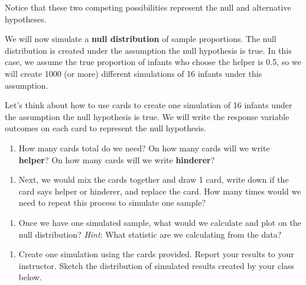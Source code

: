 \documentclass[
]{report}
\providecommand{\tightlist}{%
  \setlength{\itemsep}{0pt}\setlength{\parskip}{0pt}}
\begin{document}
Notice that these two competing possibilities represent the null and alternative hypotheses.

We will now simulate a \textbf{null distribution} of sample proportions. The null distribution is created under the assumption the null hypothesis is true. In this case, we assume the true proportion of infants who choose the helper is 0.5, so we will create 1000 (or more) different simulations of 16 infants under this assumption.

Let's think about how to use cards to create one simulation of 16 infants under the assumption the null hypothesis is true. We will write the response variable outcomes on each card to represent the null hypothesis.

\begin{enumerate}
\def\labelenumi{\arabic{enumi}.}
\setcounter{enumi}{13}
\tightlist
\item
  How many cards total do we need? On how many cards will we write \textbf{helper}? On how many cards will we write \textbf{hinderer}?
\end{enumerate}

\vspace{0.5in}

\begin{enumerate}
\def\labelenumi{\arabic{enumi}.}
\setcounter{enumi}{14}
\tightlist
\item
  Next, we would mix the cards together and draw 1 card, write down if the card says helper or hinderer, and replace the card. How many times would we need to repeat this process to simulate one sample?
\end{enumerate}

\vspace{0.5in}

\begin{enumerate}
\def\labelenumi{\arabic{enumi}.}
\setcounter{enumi}{15}
\tightlist
\item
  Once we have one simulated sample, what would we calculate and plot on the null distribution? \emph{Hint}: What statistic are we calculating from the data?
\end{enumerate}

\vspace{0.8in}

\begin{enumerate}
\def\labelenumi{\arabic{enumi}.}
\setcounter{enumi}{16}
\tightlist
\item
  Create one simulation using the cards provided. Report your results to your instructor. Sketch the distribution of simulated results created by your class below.
\end{enumerate}
\end{document}
